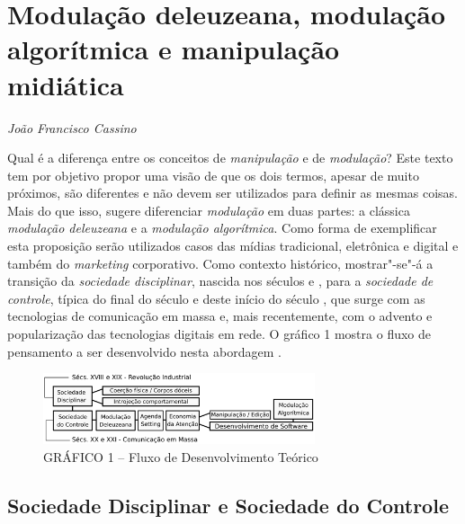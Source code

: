 \chapter{Modulação deleuzeana, modulação algorítmica e manipulação midiática}

\begin{flushright}
\emph{João Francisco Cassino}
\end{flushright}

Qual é a diferença entre os conceitos de \emph{manipulação} e de
\emph{modulação}? Este texto tem por objetivo propor uma visão de que os
dois termos, apesar de muito próximos, são diferentes e não devem ser
utilizados para definir as mesmas coisas. Mais do que isso, sugere
diferenciar \emph{modulação} em duas partes: a clássica \emph{modulação
deleuzeana} e a \emph{modulação algorítmica}. Como forma de exemplificar
esta proposição serão utilizados casos das mídias tradicional,
eletrônica e digital e também do \emph{marketing} corporativo. Como
contexto histórico, mostrar"-se"-á a transição da \emph{sociedade
disciplinar}, nascida nos séculos  e , para a \emph{sociedade de
controle}, típica do final do século  e deste início do século ,
que surge com as tecnologias de comunicação em massa e, mais
recentemente, com o advento e popularização das tecnologias digitais em
rede. O gráfico 1 mostra o fluxo de pensamento a ser desenvolvido nesta
abordagem .

\begin{figure}[!ht]
\centering
  \includegraphics[width=80mm]{./imgs/grafico1.png}
\caption{GRÁFICO 1 -- Fluxo de Desenvolvimento Teórico}
 \end{figure}

\section{Sociedade Disciplinar e Sociedade do Controle}

